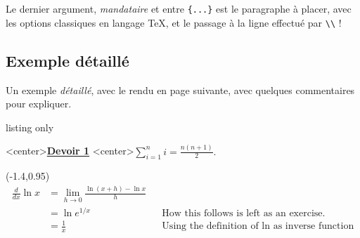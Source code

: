 \documentclass[a4paper]{article}
\begin{document}
\smallskip

Le dernier argument, \textit{mandataire} et entre \texttt{\{...\}} est le paragraphe à placer, avec les options classiques en langage \TeX{}, et le passage à la ligne effectué par \texttt{\textbackslash\textbackslash} !

\subsection{Exemple \og détaillé \fg}

Un exemple \textit{détaillé}, avec le rendu en page suivante, avec quelques commentaires pour expliquer.

\begin{PresentationCode}{listing only}
\pagestyle{empty}

\begin{PleinePageSeyes}[NumLignes]%
	\LignePapierSeyes[Echelle=1.5,Ligne=2,Couleur=red]<center>{\underline{\cursive\bfseries Devoir 1}}
	\ParagraphePapierSeyes[Ligne=10]{\cursive\lipsum[1]}
	\LignePapierSeyes[Ligne=25]<center>{${\displaystyle\sum_{i=1}^{n} i=\displaystyle\frac{n(n+1)}{2}}$.}
	
	\LignePapierSeyes[Echelle=1.1,Ligne=27](-1.4,0.95)
	{
		\begin{align*}
			\frac{d}{dx} \ln x &= \lim_{h\to 0} \frac{\ln(x+h) - \ln x}{h} \\
			&= \ln e^{1/x} &&\text{How this follows is left as an exercise.}\\
			&= \frac{1}{x} &&\text{Using the definition of ln as inverse function}
		\end{align*}
	}
\end{PleinePageSeyes}
\end{PresentationCode}
\end{document}
